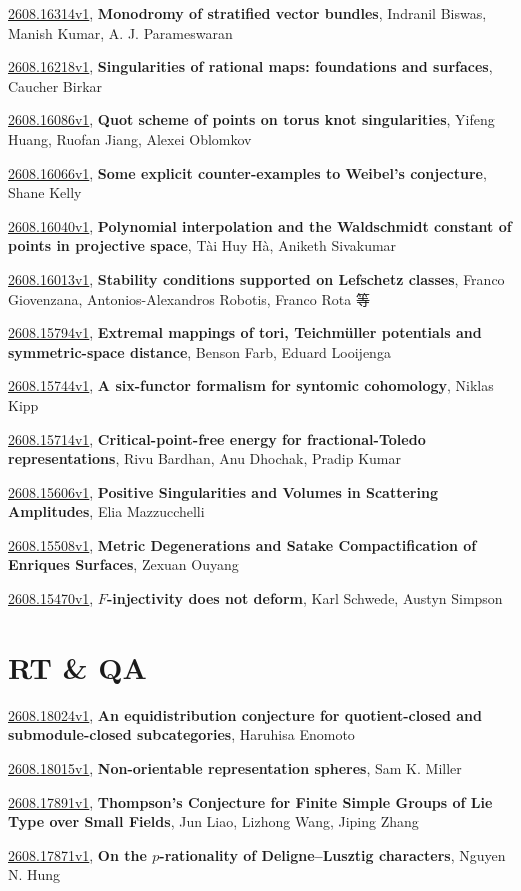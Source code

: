 \documentclass[9pt, a4paper]{article}
\theoremstyle{plain}
\theoremstyle{definition}
\theoremstyle{remark}
\newcommand{\arxiv}[3]{\href{https://arxiv.org/abs/#1}{#1}, \textbf{\textcolor{arxivblue}{#2}}, #3}
\begin{document}
\arxiv{2608.16314v1}{Monodromy of stratified vector bundles}{Indranil Biswas, Manish Kumar, A. J. Parameswaran}

\arxiv{2608.16218v1}{Singularities of rational maps: foundations and surfaces}{Caucher Birkar}

\arxiv{2608.16086v1}{Quot scheme of points on torus knot singularities}{Yifeng Huang, Ruofan Jiang, Alexei Oblomkov}

\arxiv{2608.16066v1}{Some explicit counter-examples to Weibel's conjecture}{Shane Kelly}

\arxiv{2608.16040v1}{Polynomial interpolation and the Waldschmidt constant of points in projective space}{Tài Huy Hà, Aniketh Sivakumar}

\arxiv{2608.16013v1}{Stability conditions supported on Lefschetz classes}{Franco Giovenzana, Antonios-Alexandros Robotis, Franco Rota 等}

\arxiv{2608.15794v1}{Extremal mappings of tori, Teichmüller potentials and symmetric-space distance}{Benson Farb, Eduard Looijenga}

\arxiv{2608.15744v1}{A six-functor formalism for syntomic cohomology}{Niklas Kipp}

\arxiv{2608.15714v1}{Critical-point-free energy for fractional-Toledo representations}{Rivu Bardhan, Anu Dhochak, Pradip Kumar}

\arxiv{2608.15606v1}{Positive Singularities and Volumes in Scattering Amplitudes}{Elia Mazzucchelli}

\arxiv{2608.15508v1}{Metric Degenerations and Satake Compactification of Enriques Surfaces}{Zexuan Ouyang}

\arxiv{2608.15470v1}{$F$-injectivity does not deform}{Karl Schwede, Austyn Simpson}


\section{RT \& QA}
\arxiv{2608.18024v1}{An equidistribution conjecture for quotient-closed and submodule-closed subcategories}{Haruhisa Enomoto}

\arxiv{2608.18015v1}{Non-orientable representation spheres}{Sam K. Miller}

\arxiv{2608.17891v1}{Thompson's Conjecture for Finite Simple Groups of Lie Type over Small Fields}{Jun Liao, Lizhong Wang, Jiping Zhang}

\arxiv{2608.17871v1}{On the $p$-rationality of Deligne--Lusztig characters}{Nguyen N. Hung}
\end{document}
